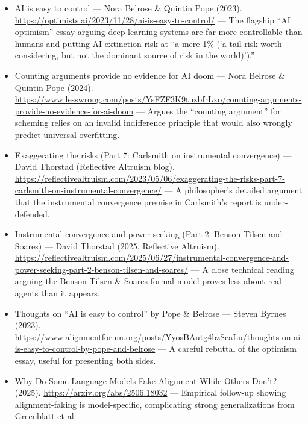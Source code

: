 \documentclass[11pt]{article}
\begin{document}
\begin{itemize}
  \item AI is easy to control --- Nora Belrose \& Quintin Pope (2023). \href{https://optimists.ai/2023/11/28/ai-is-easy-to-control/}{https://optimists.ai/2023/11/28/ai-is-easy-to-control/} --- The flagship ``AI optimism'' essay arguing deep-learning systems are far more controllable than humans and putting AI extinction risk at ``a mere 1\% (`a tail risk worth considering, but not the dominant source of risk in the world)').''
  \item Counting arguments provide no evidence for AI doom --- Nora Belrose \& Quintin Pope (2024). \href{https://www.lesswrong.com/posts/YsFZF3K9tuzbfrLxo/counting-arguments-provide-no-evidence-for-ai-doom}{https://www.lesswrong.com/posts/YsFZF3K9tuzbfrLxo/counting-arguments-provide-no-evidence-for-ai-doom} --- Argues the ``counting argument'' for scheming relies on an invalid indifference principle that would also wrongly predict universal overfitting.
  \item Exaggerating the risks (Part 7: Carlsmith on instrumental convergence) --- David Thorstad (Reflective Altruism blog). \href{https://reflectivealtruism.com/2023/05/06/exaggerating-the-risks-part-7-carlsmith-on-instrumental-convergence/}{https://reflectivealtruism.com/2023/05/06/exaggerating-the-risks-part-7-carlsmith-on-instrumental-convergence/} --- A philosopher's detailed argument that the instrumental convergence premise in Carlsmith's report is under-defended.
  \item Instrumental convergence and power-seeking (Part 2: Benson-Tilsen and Soares) --- David Thorstad (2025, Reflective Altruism). \href{https://reflectivealtruism.com/2025/06/27/instrumental-convergence-and-power-seeking-part-2-benson-tilsen-and-soares/}{https://reflectivealtruism.com/2025/06/27/instrumental-convergence-and-power-seeking-part-2-benson-tilsen-and-soares/} --- A close technical reading arguing the Benson-Tilsen \& Soares formal model proves less about real agents than it appears.
  \item Thoughts on ``AI is easy to control'' by Pope \& Belrose --- Steven Byrnes (2023). \href{https://www.alignmentforum.org/posts/YyosBAutg4bzScaLu/thoughts-on-ai-is-easy-to-control-by-pope-and-belrose}{https://www.alignmentforum.org/posts/YyosBAutg4bzScaLu/thoughts-on-ai-is-easy-to-control-by-pope-and-belrose} --- A careful rebuttal of the optimism essay, useful for presenting both sides.
  \item Why Do Some Language Models Fake Alignment While Others Don't? --- (2025). \href{https://arxiv.org/abs/2506.18032}{https://arxiv.org/abs/2506.18032} --- Empirical follow-up showing alignment-faking is model-specific, complicating strong generalizations from Greenblatt et al.
\end{itemize}



\end{document}
